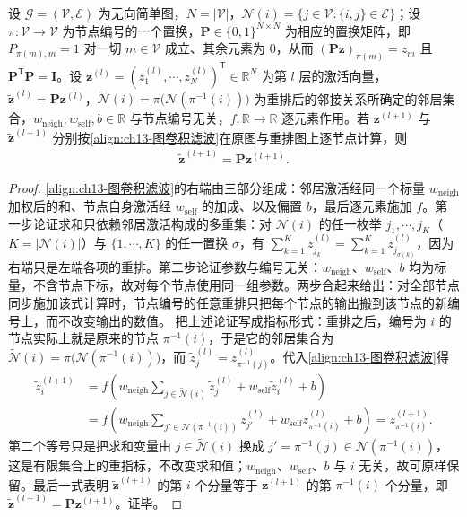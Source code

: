\documentclass[../../main.tex]{subfiles}
\begin{document}
\begin{proposition}[图形式卷积滤波器的置换等变性]\label{proposition:ch13-图滤波器等变性}
设 $\mathcal{G}=(\mathcal{V},\mathcal{E})$ 为无向简单图，$N=|\mathcal{V}|$，$\mathcal{N}(i)=\{j\in\mathcal{V}:\{i,j\}\in\mathcal{E}\}$；设 $\pi:\mathcal{V}\to\mathcal{V}$ 为节点编号的一个置换，$\bm{P}\in\{0,1\}^{N\times N}$ 为相应的置换矩阵，即 $P_{\pi(m),m}=1$ 对一切 $m\in\mathcal{V}$ 成立、其余元素为 $0$，从而 $(\bm{P}\bm{z})_{\pi(m)}=z_m$ 且 $\bm{P}^{\mathsf T}\bm{P}=\bm{I}$。设 $\bm{z}^{(l)}=(z_1^{(l)},\cdots,z_N^{(l)})^{\mathsf T}\in\mathbb{R}^{N}$ 为第 $l$ 层的激活向量，$\widetilde{\bm{z}}^{(l)}=\bm{P}\bm{z}^{(l)}$，$\widetilde{\mathcal{N}}(i)=\pi\big(\mathcal{N}(\pi^{-1}(i))\big)$ 为重排后的邻接关系所确定的邻居集合，$w_{\mathrm{neigh}},w_{\mathrm{self}},b\in\mathbb{R}$ 与节点编号无关，$f:\mathbb{R}\to\mathbb{R}$ 逐元素作用。若 $\bm{z}^{(l+1)}$ 与 $\widetilde{\bm{z}}^{(l+1)}$ 分别按\eqref{align:ch13-图卷积滤波}在原图与重排图上逐节点计算，则
\begin{align*}
\widetilde{\bm{z}}^{(l+1)}=\bm{P}\bm{z}^{(l+1)}.
\end{align*}
\end{proposition}

\begin{proof}
\eqref{align:ch13-图卷积滤波}的右端由三部分组成：邻居激活经同一个标量 $w_{\mathrm{neigh}}$ 加权后的和、节点自身激活经 $w_{\mathrm{self}}$ 的加成、以及偏置 $b$，最后逐元素施加 $f$。第一步论证求和只依赖邻居激活构成的多重集：对 $\mathcal{N}(i)$ 的任一枚举 $j_1,\cdots,j_K$（$K=|\mathcal{N}(i)|$）与 $\{1,\cdots,K\}$ 的任一置换 $\sigma$，有 $\sum_{k=1}^{K}z_{j_k}^{(l)}=\sum_{k=1}^{K}z_{j_{\sigma(k)}}^{(l)}$，因为右端只是左端各项的重排。第二步论证参数与编号无关：$w_{\mathrm{neigh}}$、$w_{\mathrm{self}}$、$b$ 均为标量，不含节点下标，故对每个节点使用同一组参数。两步合起来给出：对全部节点同步施加该式计算时，节点编号的任意重排只把每个节点的输出搬到该节点的新编号上，而不改变输出的数值。
把上述论证写成指标形式：重排之后，编号为 $i$ 的节点实际上就是原来的节点 $\pi^{-1}(i)$，于是它的邻居集合为 $\widetilde{\mathcal{N}}(i)=\pi\big(\mathcal{N}(\pi^{-1}(i))\big)$，而 $\widetilde z_j^{(l)}=z_{\pi^{-1}(j)}^{(l)}$。代入\eqref{align:ch13-图卷积滤波}得
\begin{align*}
\widetilde z_i^{(l+1)}&=f\!\left(w_{\mathrm{neigh}}\sum_{j\in\widetilde{\mathcal{N}}(i)}\widetilde z_j^{(l)}+w_{\mathrm{self}}\widetilde z_i^{(l)}+b\right)\\
&=f\!\left(w_{\mathrm{neigh}}\sum_{j'\in\mathcal{N}(\pi^{-1}(i))}z_{j'}^{(l)}+w_{\mathrm{self}}z_{\pi^{-1}(i)}^{(l)}+b\right)=z_{\pi^{-1}(i)}^{(l+1)}.
\end{align*}
第二个等号只是把求和变量由 $j\in\widetilde{\mathcal{N}}(i)$ 换成 $j'=\pi^{-1}(j)\in\mathcal{N}(\pi^{-1}(i))$，这是有限集合上的重指标，不改变求和值；$w_{\mathrm{neigh}}$、$w_{\mathrm{self}}$、$b$ 与 $i$ 无关，故可原样保留。最后一式表明 $\widetilde{\bm{z}}^{(l+1)}$ 的第 $i$ 个分量等于 $\bm{z}^{(l+1)}$ 的第 $\pi^{-1}(i)$ 个分量，即 $\widetilde{\bm{z}}^{(l+1)}=\bm{P}\bm{z}^{(l+1)}$。证毕。
\end{proof}
\end{document}
